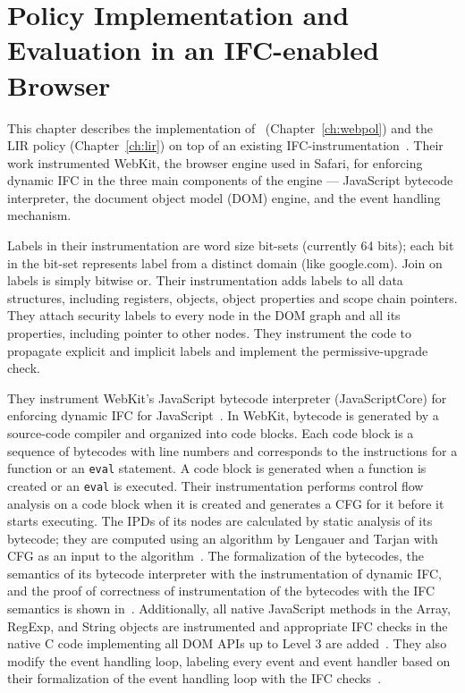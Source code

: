 \chapter{Policy Implementation and Evaluation in an IFC-enabled Browser}
\label{ch:eval}

This chapter describes the implementation of \sys~(Chapter~\ref{ch:webpol}) 
and the LIR policy (Chapter~\ref{ch:lir}) on top of
an existing IFC-instrumentation~\cite{just11PLASTIC,post14,csf15}. 
Their work instrumented WebKit, the browser engine used in Safari, for enforcing 
dynamic IFC in the three main components of the engine --- JavaScript 
bytecode interpreter, the document object model (DOM) engine, and the
event handling mechanism. 

Labels in their instrumentation are word size bit-sets (currently 64 
bits); each bit in the bit-set represents label from a distinct domain
(like google.com). Join on labels is simply bitwise or. Their
instrumentation adds labels to all data structures, including
registers, objects, object properties and scope chain pointers. They 
attach security labels to every node in the DOM graph and all its 
properties, including pointer to other nodes. 
They instrument the code to propagate explicit and implicit labels 
and implement the permissive-upgrade check. 

They instrument WebKit’s JavaScript bytecode interpreter (JavaScriptCore) 
for enforcing dynamic IFC for JavaScript~\cite{just11PLASTIC,post14}. 
In WebKit, bytecode is generated
by a source-code compiler and organized into code blocks. Each code
block is a sequence of bytecodes with line numbers and corresponds to
the instructions for a function or an \texttt{eval} statement. A code
block is generated when a function is created or an \texttt{eval} is
executed. Their instrumentation performs control flow analysis on a
code block when it is created and generates a CFG for it before it
starts executing. The IPDs of its nodes are calculated by static
analysis of its bytecode; they are computed using an algorithm by
Lengauer and Tarjan with CFG as an input to the
algorithm~\cite{Lengauer}. The formalization of the bytecodes, the
semantics of its bytecode interpreter with the instrumentation of
dynamic IFC, and the proof of correctness of instrumentation of the
bytecodes with the IFC semantics is shown in~\cite{post14Extended}.
Additionally, all native JavaScript methods in the Array, RegExp, 
and String objects are instrumented and appropriate  
IFC checks in the native C code implementing all DOM APIs up
to Level 3 are added~\cite{csf15}. 
They also modify the event handling loop, labeling every event and
event handler based on their formalization of the event handling loop
with the IFC checks~\cite{csf15}.  

